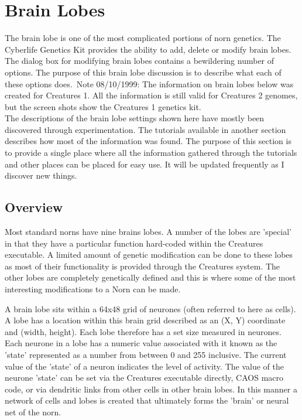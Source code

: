 \documentclass[11pt,twoside,a4paper]{article}
\begin{document}

\section{Brain Lobes} %

The brain lobe is one of the most complicated portions of norn genetics. The Cyberlife Genetics Kit provides the ability to add, delete or modify brain lobes. The dialog box for modifying brain lobes contains a bewildering number of options. The purpose of this brain lobe discussion is to describe what each of these options does.~\footnotesize{Note 08/10/1999: The information on brain lobes below was created for Creatures 1. All the information is still valid for Creatures 2 genomes, but the screen shots show the Creatures 1 genetics kit.}~\normalsize{}~\\


The descriptions of the brain lobe settings shown here have mostly been discovered through experimentation. The tutorials available in another section  describes how most of the information was found. The purpose of this section is to provide a single place where all the information gathered through the tutorials and other places can be placed for easy use. It will be updated frequently as I discover new things.

\subsection{Overview}

Most standard norns have nine brains lobes. A number of the lobes are 'special' in that they have a particular function hard-coded within the Creatures executable. A limited amount of genetic modification can be done to these lobes as most of their functionality is provided through the Creatures system. The other lobes are completely genetically defined and this is where some of the most interesting modifications to a Norn can be made.~\\

\clearpage

A brain lobe sits within a 64x48 grid of neurones (often referred to here as cells). A lobe has a location within this brain grid described as an (X, Y) coordinate and (width, height). Each lobe therefore has a set size measured in neurones. Each neurone in a lobe has a numeric value associated with it known as the 'state' represented as a number from between 0 and 255 inclusive. The current value of the 'state' of a neuron indicates the level of activity. The value of the neurone 'state' can be set via the Creatures executable directly, CAOS macro code, or via dendritic links from other cells in other brain lobes. In this manner a network of cells and lobes is created that ultimately forms the 'brain' or neural net of the norn.~\\
\end{document}
